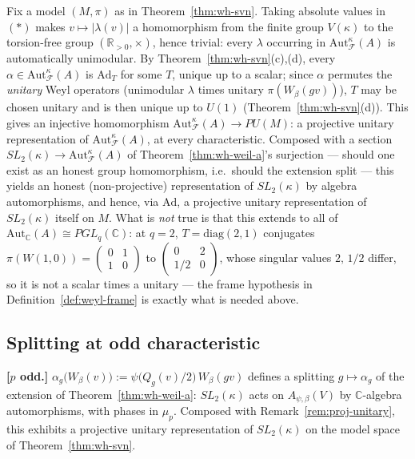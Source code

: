\begin{remark}
\label{rem:proj-unitary}
Fix a model $(M,\pi)$ as in Theorem~\ref{thm:wh-svn}. Taking absolute values
in $(*)$ makes $v\mapsto|\lambda(v)|$ a homomorphism from the finite group
$V(\kappa)$ to the torsion-free group $(\mathbb{R}_{>0},\times)$, hence
trivial: every $\lambda$ occurring in
$\mathrm{Aut}_{\mathcal{F}}^\kappa(A)$ is automatically unimodular. By
Theorem~\ref{thm:wh-svn}(c),(d), every $\alpha\in\mathrm{Aut}_{\mathcal{F}}^\kappa(A)$
is $\mathrm{Ad}_T$ for some $T$, unique up to a scalar; since $\alpha$
permutes the \emph{unitary} Weyl operators (unimodular $\lambda$ times
unitary $\pi(W_\beta(gv))$), $T$ may be chosen unitary and is then unique up
to $U(1)$ (Theorem~\ref{thm:wh-svn}(d)). This gives an injective
homomorphism $\mathrm{Aut}_{\mathcal{F}}^\kappa(A)\to PU(M)$: a projective
unitary representation of $\mathrm{Aut}_{\mathcal{F}}^\kappa(A)$, at every
characteristic. Composed with a section $SL_2(\kappa)\to\mathrm{Aut}_{\mathcal{F}}^\kappa(A)$
of Theorem~\ref{thm:wh-weil-a}'s surjection — should one exist as an honest
group homomorphism, i.e.\ should the extension split — this yields an
honest (non-projective) representation of $SL_2(\kappa)$ by algebra
automorphisms, and hence, via $\mathrm{Ad}$, a projective unitary
representation of $SL_2(\kappa)$ itself on $M$. What is \emph{not} true is
that this extends to all of $\mathrm{Aut}_{\mathbb{C}}(A)\cong PGL_q(\mathbb{C})$:
at $q=2$, $T=\mathrm{diag}(2,1)$ conjugates $\pi(W(1,0))=\left(\begin{smallmatrix}0&1\\1&0\end{smallmatrix}\right)$
to $\left(\begin{smallmatrix}0&2\\1/2&0\end{smallmatrix}\right)$, whose singular values $2,\,1/2$ differ, so it is not a
scalar times a unitary — the frame hypothesis in
Definition~\ref{def:weyl-frame} is exactly what is needed above.
\end{remark}

\subsection{Splitting at odd characteristic}

\statusProvedConditional
\begin{theorem}
\label{thm:wh-weil-b}
\textbf{[$p$ odd.]} $\alpha_g\big(W_\beta(v)\big) := \psi\big(Q_g(v)/2\big)\,W_\beta(gv)$
defines a splitting $g\mapsto\alpha_g$ of the extension of
Theorem~\ref{thm:wh-weil-a}: $SL_2(\kappa)$ acts on $A_{\psi,\beta}(V)$ by
$\mathbb{C}$-algebra automorphisms, with phases in $\mu_p$. Composed with
Remark~\ref{rem:proj-unitary}, this exhibits a projective unitary
representation of $SL_2(\kappa)$ on the model space of
Theorem~\ref{thm:wh-svn}.
\end{theorem}

